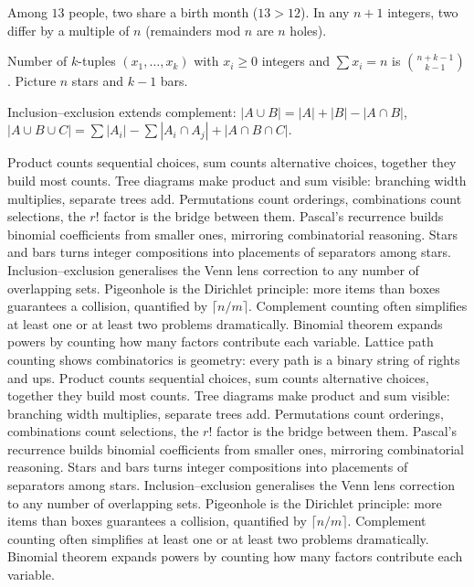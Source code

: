 \begin{example}
Among $13$ people, two share a birth month ($13>12$). In any $n+1$ integers, two differ by a multiple of $n$ (remainders mod $n$ are $n$ holes).
\end{example}

\begin{theorem}
Number of $k$-tuples $(x_1,\dots,x_k)$ with $x_i\ge0$ integers and $\sum x_i=n$ is $\binom{n+k-1}{k-1}$. Picture $n$ stars and $k-1$ bars.
\end{theorem}

Inclusion--exclusion extends complement: $|A\cup B|=|A|+|B|-|A\cap B|$, $|A\cup B\cup C|=\sum|A_i|-\sum|A_i\cap A_j|+|A\cap B\cap C|$.

Product counts sequential choices, sum counts alternative choices, together they build most counts.
Tree diagrams make product and sum visible: branching width multiplies, separate trees add.
Permutations count orderings, combinations count selections, the $r!$ factor is the bridge between them.
Pascal's recurrence builds binomial coefficients from smaller ones, mirroring combinatorial reasoning.
Stars and bars turns integer compositions into placements of separators among stars.
Inclusion--exclusion generalises the Venn lens correction to any number of overlapping sets.
Pigeonhole is the Dirichlet principle: more items than boxes guarantees a collision, quantified by $\lceil n/m\rceil$.
Complement counting often simplifies at least one or at least two problems dramatically.
Binomial theorem expands powers by counting how many factors contribute each variable.
Lattice path counting shows combinatorics is geometry: every path is a binary string of rights and ups.
Product counts sequential choices, sum counts alternative choices, together they build most counts.
Tree diagrams make product and sum visible: branching width multiplies, separate trees add.
Permutations count orderings, combinations count selections, the $r!$ factor is the bridge between them.
Pascal's recurrence builds binomial coefficients from smaller ones, mirroring combinatorial reasoning.
Stars and bars turns integer compositions into placements of separators among stars.
Inclusion--exclusion generalises the Venn lens correction to any number of overlapping sets.
Pigeonhole is the Dirichlet principle: more items than boxes guarantees a collision, quantified by $\lceil n/m\rceil$.
Complement counting often simplifies at least one or at least two problems dramatically.
Binomial theorem expands powers by counting how many factors contribute each variable.
